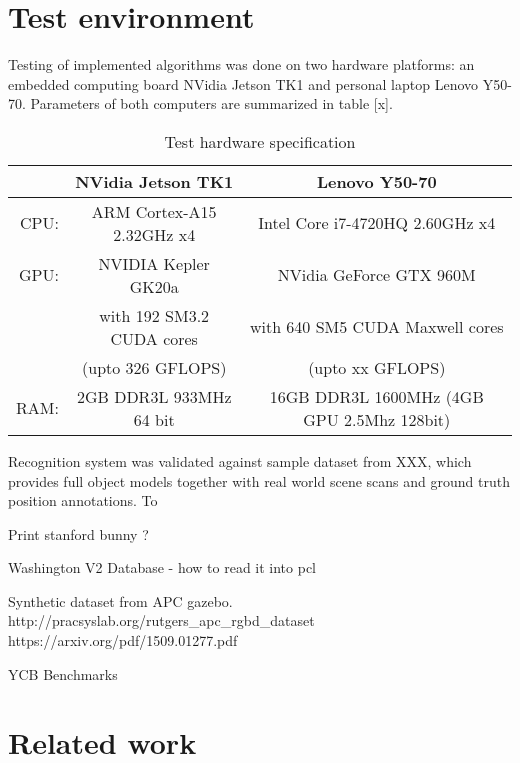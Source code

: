 \section{Test environment}
\label{sec:testhardware}




Testing of implemented algorithms was done on two hardware platforms: an embedded computing board NVidia Jetson TK1 and personal laptop Lenovo Y50-70. Parameters of both computers are summarized in table [x]. 

\begin{table}[H]
\centering
\begin{tabular}{r c | c}
& NVidia Jetson TK1 & Lenovo Y50-70 \\ 
 \hline
 CPU:& ARM Cortex-A15 2.32GHz x4 & Intel Core i7-4720HQ 2.60GHz x4\\
 GPU:& NVIDIA Kepler GK20a & NVidia GeForce GTX 960M \\
 &with 192 SM3.2 CUDA cores& with 640 SM5 CUDA Maxwell cores\\
 &(upto 326 GFLOPS)&(upto xx GFLOPS)\\
 RAM:& 2GB DDR3L 933MHz 64 bit&  16GB DDR3L 1600MHz (4GB GPU 2.5Mhz 128bit)
\end{tabular}
\caption{Test hardware specification}
\label{tab:hardware}
\end{table}

Recognition system was validated against sample dataset from XXX, which provides full object models together with real world scene scans and ground truth position annotations. To 


Print stanford bunny ?

Washington V2 Database - how to read it into pcl

Synthetic dataset from APC gazebo.
http://pracsyslab.org/rutgers_apc_rgbd_dataset
https://arxiv.org/pdf/1509.01277.pdf


YCB Benchmarks 


\section{Related work}
\label{sec:related}


